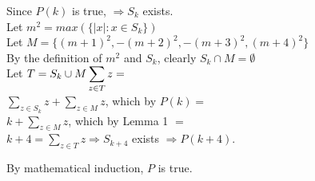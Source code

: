 \documentclass[fleqn]{article}
\begin{document}
Since $P(k)$ is true, $\Rightarrow S_{k}$ exists.\\
Let $m^2 = max(\lbrace |x| : x \in S_{k} \rbrace)$\\
Let $M = \lbrace (m+1)^2, -(m+2)^2, -(m+3)^2, (m+4)^2 \rbrace$\\
By the definition of $m^2$ and $S_{k}$, clearly $S_{k} \cap M = \emptyset$\\
Let $T = S_{k} \cup M \\
\displaystyle\sum\limits_{z \in T} z =$\\
$\displaystyle\sum\limits_{z \in S_{k}} z + \displaystyle\sum\limits_{z \in M} z$, which by $P(k) =$\\
$k + \displaystyle\sum\limits_{z \in M} z$, which by Lemma 1 $=$\\
$k + 4 = \displaystyle\sum\limits_{z \in T} z \Rightarrow S_{k+4}$ exists $\Rightarrow P(k+4)$.

By mathematical induction, $P$ is true.
\end{document}
